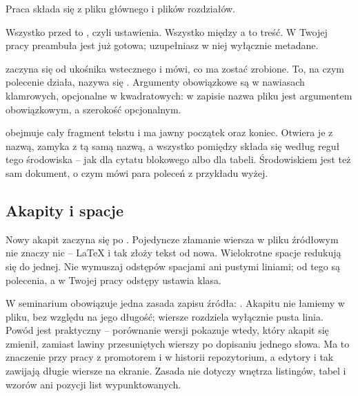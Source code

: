 Praca składa się z pliku głównego i plików rozdziałów.


Wszystko przed  to , czyli ustawienia. Wszystko między  a  to treść. W Twojej pracy preambuła jest już gotowa; uzupełniasz w niej wyłącznie metadane.

 zaczyna się od ukośnika wstecznego i mówi, co ma zostać zrobione. To, na czym polecenie działa, nazywa się . Argumenty obowiązkowe są w nawiasach klamrowych, opcjonalne w kwadratowych: w zapisie  nazwa pliku jest argumentem obowiązkowym, a szerokość opcjonalnym.

 obejmuje cały fragment tekstu i ma jawny początek oraz koniec. Otwiera je  z nazwą, zamyka  z tą samą nazwą, a wszystko pomiędzy składa się według reguł tego środowiska -- jak  dla cytatu blokowego albo  dla tabeli. Środowiskiem jest też sam dokument, o czym mówi para poleceń z przykładu wyżej.

\subsection{Akapity i spacje}

Nowy akapit zaczyna się po . Pojedyncze złamanie wiersza w pliku źródłowym nie znaczy nic -- LaTeX i tak złoży tekst od nowa. Wielokrotne spacje redukują się do jednej. Nie wymuszaj odstępów spacjami ani pustymi liniami; od tego są polecenia, a w Twojej pracy odstępy ustawia klasa.

W seminarium obowiązuje jedna zasada zapisu źródła: . Akapitu nie łamiemy w pliku, bez względu na jego długość; wiersze rozdziela wyłącznie pusta linia. Powód jest praktyczny -- porównanie wersji pokazuje wtedy, który akapit się zmienił, zamiast lawiny przesuniętych wierszy po dopisaniu jednego słowa. Ma to znaczenie przy pracy z promotorem i w historii repozytorium, a edytory i tak zawijają długie wiersze na ekranie. Zasada nie dotyczy wnętrza listingów, tabel i wzorów ani pozycji list wypunktowanych.

